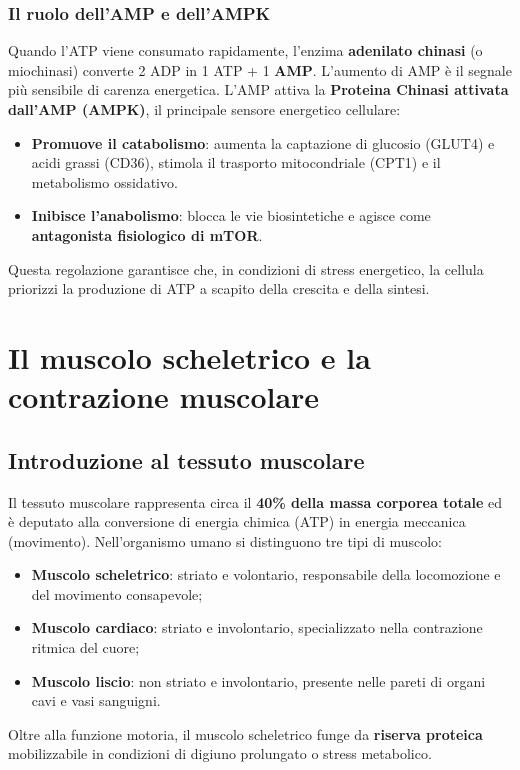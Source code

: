 \documentclass[12pt,a4paper]{report}
\begin{document}
\subsection{Il ruolo dell'AMP e dell'AMPK}
Quando l'ATP viene consumato rapidamente, l'enzima \textbf{adenilato chinasi} (o miochinasi) converte 2 ADP in 1 ATP + 1 \textbf{AMP}. L'aumento di AMP è il segnale più sensibile di carenza energetica.
L'AMP attiva la \textbf{Proteina Chinasi attivata dall'AMP (AMPK)}, il principale sensore energetico cellulare:
\begin{itemize}
\item \textbf{Promuove il catabolismo}: aumenta la captazione di glucosio (GLUT4) e acidi grassi (CD36), stimola il trasporto mitocondriale (CPT1) e il metabolismo ossidativo.
\item \textbf{Inibisce l'anabolismo}: blocca le vie biosintetiche e agisce come \textbf{antagonista fisiologico di mTOR}.
\end{itemize}
Questa regolazione garantisce che, in condizioni di stress energetico, la cellula priorizzi la produzione di ATP a scapito della crescita e della sintesi.

\chapter{Il muscolo scheletrico e la contrazione muscolare}
\section{Introduzione al tessuto muscolare}
Il tessuto muscolare rappresenta circa il \textbf{40\% della massa corporea totale} ed è deputato alla conversione di energia chimica (ATP) in energia meccanica (movimento). Nell'organismo umano si distinguono tre tipi di muscolo:
\begin{itemize}
\item \textbf{Muscolo scheletrico}: striato e volontario, responsabile della locomozione e del movimento consapevole;
\item \textbf{Muscolo cardiaco}: striato e involontario, specializzato nella contrazione ritmica del cuore;
\item \textbf{Muscolo liscio}: non striato e involontario, presente nelle pareti di organi cavi e vasi sanguigni.
\end{itemize}
Oltre alla funzione motoria, il muscolo scheletrico funge da \textbf{riserva proteica} mobilizzabile in condizioni di digiuno prolungato o stress metabolico.
\end{document}
